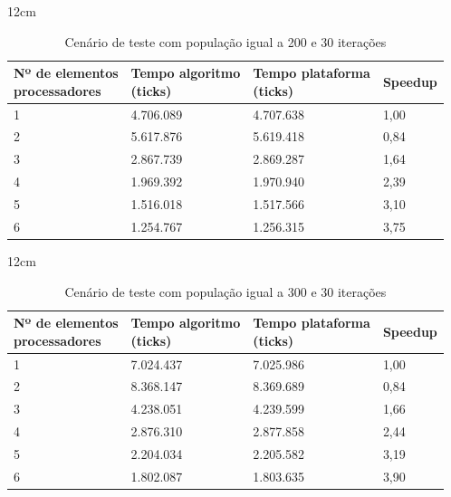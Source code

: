\begin{table}[h]{12cm}
    \caption{Cenário de teste com população igual a 200 e 30 iterações}
    \label{cenario7}
    \begin{tabular}{llll}
        \hline
        \shortstack[l]{Nº de elementos \\ processadores} & \shortstack[l]{Tempo algoritmo \\ (ticks)} & \shortstack[l]{Tempo plataforma \\ (ticks)} & Speedup \\
        \hline
        1 & 4.706.089 & 4.707.638 & 1,00 \\
        2 & 5.617.876 & 5.619.418 & 0,84 \\
        3 & 2.867.739 & 2.869.287 &	1,64 \\
        4 & 1.969.392 & 1.970.940 & 2,39 \\
        5 & 1.516.018 & 1.517.566 & 3,10 \\
        6 & 1.254.767 & 1.256.315 & 3,75 \\
        \hline
    \end{tabular}
\end{table}

\begin{table}[h]{12cm}
    \caption{Cenário de teste com população igual a 300 e 30 iterações}
    \label{cenario8}
    \begin{tabular}{llll}
        \hline
        \shortstack[l]{Nº de elementos \\ processadores} & \shortstack[l]{Tempo algoritmo \\ (ticks)} & \shortstack[l]{Tempo plataforma \\ (ticks)} & Speedup \\
        \hline
        1 & 7.024.437 & 7.025.986 & 1,00 \\
        2 & 8.368.147 & 8.369.689 & 0,84 \\
        3 & 4.238.051 & 4.239.599 &	1,66 \\
        4 & 2.876.310 & 2.877.858 & 2,44 \\
        5 & 2.204.034 & 2.205.582 & 3,19 \\
        6 & 1.802.087 & 1.803.635 & 3,90 \\
        \hline
    \end{tabular}
\end{table}

